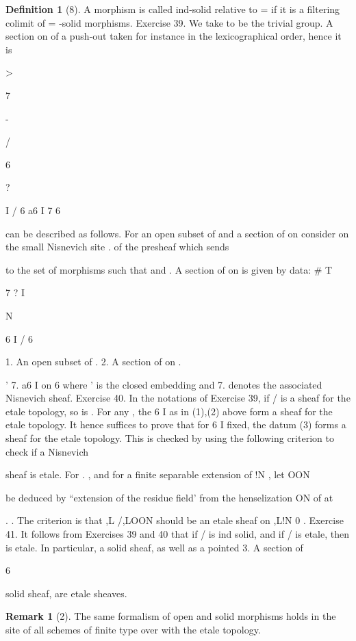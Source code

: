 \documentclass[11pt,a4paper]{article}
\theoremstyle{plain}
\theoremstyle{definition}
\newtheorem{definition}[theorem]{Definition}
\newtheorem{remark}[theorem]{Remark}
\begin{document}
\begin{definition}[8]
A morphism is called ind-solid relative to = if it is a filtering colimit
of = -solid morphisms.
Exercise 39. We take to be the trivial group. A section on  of a push-out
taken for instance in the lexicographical order, hence it is

  


>

7

-

/ 

6 


 ? 


I / 6
a6 I
  7 6 

can be described as follows. For an open subset of and a section of on
consider on the small Nisnevich site .   of the presheaf
which sends

to the set of morphisms
such that 
and
.
A
section
of
on
is
given
by
data:
\# T

7 ?
I


 N

6 
I / 6

1. An open subset of .
2. A section of on .



' 7.   a6 I on   6 where ' is the closed embedding
 and 7.   denotes the associated Nisnevich sheaf.
Exercise 40. In the notations of Exercise 39, if / is a sheaf for the etale topology, so
is . For any  , the 6 I as in (1),(2) above form a sheaf for the etale topology. It
hence suffices to prove that for 6 I fixed, the datum (3) forms a sheaf for the etale
topology. This is checked by using the following criterion to check if a Nisnevich

sheaf is etale. For .   , and for a finite separable extension of !N , let OON

be deduced by ``extension of the residue field' from the henselization ON of  at

. . The criterion is that ,L   /,LOON
 should be an etale sheaf on
,L!N 0 .
Exercise 41. It follows from Exercises 39 and 40 that if  /
is ind solid,
and if / is etale, then is etale. In particular, a solid sheaf, as well as a pointed
3. A section of

 6

solid sheaf, are etale sheaves.

\end{definition}

\begin{remark}[2]
The same formalism of open and solid morphisms holds in the site of all
schemes of finite type over with the etale topology.



\end{remark}
\end{document}
